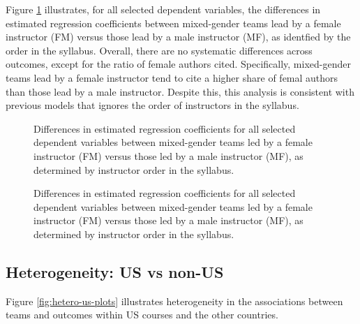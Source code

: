 \documentclass[
  british,
  12pt, %
]{article}
\begin{document}
Figure \ref{fig:leading} illustrates, for all selected dependent variables, the differences in estimated regression coefficients between mixed-gender teams lead by a female instructor (FM) versus those lead by a male instructor (MF), as identfied by the order in the syllabus. Overall, there are no systematic differences across outcomes, except for the ratio of female authors cited. Specifically, mixed-gender teams lead by a female instructor tend to cite a higher share of femal authors than those lead by a male instructor. Despite this, this analysis is consistent with previous models that ignores the order of instructors in the syllabus.
\begin{figure}
\centering
{\label{fig:leading}Differences in estimated regression coefficients for all selected dependent variables between mixed-gender teams led by a female instructor (FM) versus those led by a male instructor (MF), as determined by instructor order in the syllabus.}
\caption{\label{fig:leading}Differences in estimated regression coefficients for all selected dependent variables between mixed-gender teams led by a female instructor (FM) versus those led by a male instructor (MF), as determined by instructor order in the syllabus.}
\end{figure}

\subsection{Heterogeneity: US vs non-US}\label{heterogeneity-us-vs-non-us}

Figure \ref{fig:hetero-us-plots} illustrates heterogeneity in the associations between teams and outcomes within US courses and the other countries.
\end{document}
